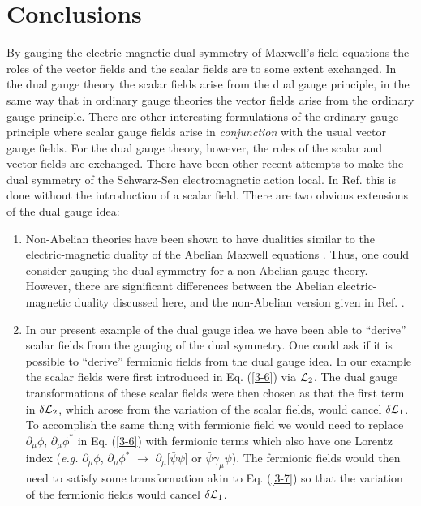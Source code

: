 \documentclass[a4paper,aps]{revtex4}
\begin{document}
\section{Conclusions}

By gauging the electric-magnetic dual
symmetry of Maxwell's field equations the roles of the
vector fields and the scalar fields are to some extent
exchanged. In the dual gauge theory the scalar fields arise
from the dual gauge principle, in the same way that in ordinary
gauge theories the vector fields
arise from the ordinary gauge principle.
There are other interesting formulations of the ordinary
gauge principle \cite{chaves} where scalar gauge fields arise
in {\it conjunction} with the usual vector gauge fields. For the dual
gauge theory, however, the roles of the scalar and vector fields
are exchanged. There have been other recent attempts
\cite{pak} to make the dual symmetry of the Schwarz-Sen electromagnetic
action \cite{sen} local. In Ref. \cite{pak} this is done
without the introduction of a scalar field. There are two
obvious extensions of the dual gauge idea:

\begin{enumerate}


\item{Non-Abelian theories have been shown to have dualities similar
to the electric-magnetic duality of the Abelian Maxwell equations
\cite{tsou}. Thus, one could consider gauging the dual symmetry for
a non-Abelian gauge theory. However, there are significant differences
between the Abelian electric-magnetic duality discussed here,
and the non-Abelian version given in Ref. \cite{tsou}.}

\item{In our present example of the dual gauge idea we have been able
to ``derive'' scalar fields from the gauging of the dual symmetry.
One could ask if it is possible to ``derive'' fermionic fields
from the dual gauge idea. In our example the scalar fields
were first introduced in Eq. (\ref{3-6}) via ${\cal L}_2$. The
dual gauge transformations of these scalar fields were then chosen
as that the first term in $\delta {\cal L}_2$, which arose from the
variation of the scalar fields, would cancel $\delta {\cal L}_1$.
To accomplish the same thing with fermionic field we would need to
replace $\partial _{\mu} \phi$, $\partial _{\mu} \phi ^{\ast}$ in Eq.
(\ref{3-6}) with fermionic terms which also have one Lorentz index
({\it e.g.} $\partial _{\mu} \phi$, $\partial _{\mu} \phi ^{\ast}$
$\rightarrow$ $\partial_{\mu} [{\bar \psi} \psi$] or
${\bar \psi} \gamma _{\mu} \psi$). The fermionic fields would then
need to satisfy some transformation akin to Eq. (\ref{3-7}) so that
the variation of the fermionic fields would cancel
$\delta {\cal L}_1$.}

\end{enumerate}
\end{document}
